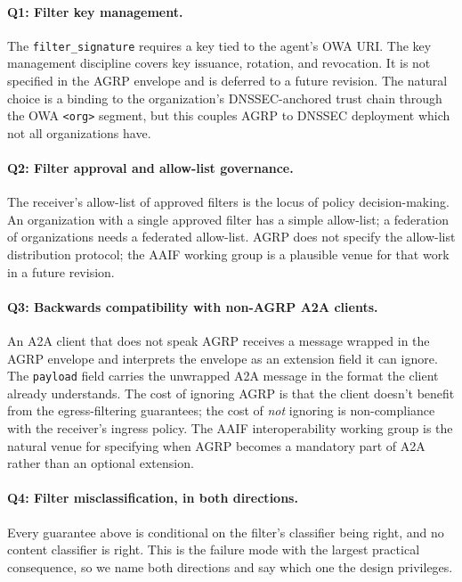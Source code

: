\paragraph{Q1: Filter key management.}
The \texttt{filter\_signature} requires a key tied to
the agent's OWA URI. The key management discipline
covers key issuance, rotation, and revocation. It is not
specified in the AGRP envelope and is deferred to a future
revision. The natural choice is a binding to the
organization's DNSSEC-anchored trust chain through the
OWA \texttt{<org>} segment, but this couples AGRP to
DNSSEC deployment which not all organizations have.

\paragraph{Q2: Filter approval and allow-list governance.}
The receiver's allow-list of approved filters is the
locus of policy decision-making. An organization with
a single approved filter has a simple allow-list; a
federation of organizations needs a federated
allow-list. AGRP does not specify the allow-list
distribution protocol; the AAIF working group is a
plausible venue for that work in a future revision.

\paragraph{Q3: Backwards compatibility with non-AGRP A2A clients.}
An A2A client that does not speak AGRP receives a
message wrapped in the AGRP envelope and interprets
the envelope as an extension field it can ignore. The
\texttt{payload} field carries the unwrapped A2A
message in the format the client already understands.
The cost of ignoring AGRP is that the client doesn't
benefit from the egress-filtering guarantees; the
cost of \emph{not} ignoring is non-compliance with
the receiver's ingress policy. The AAIF interoperability
working group is the natural venue for specifying when
AGRP becomes a mandatory part of A2A rather than an
optional extension.

\paragraph{Q4: Filter misclassification, in both
directions.}
Every guarantee above is conditional on the filter's
classifier being right, and no content classifier is right.
This is the failure mode with the largest practical
consequence, so we name both directions and say which one
the design privileges.

